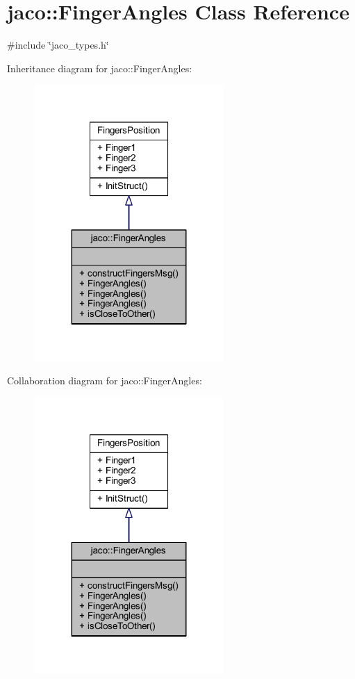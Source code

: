\hypertarget{classjaco_1_1FingerAngles}{}\section{jaco\+:\+:Finger\+Angles Class Reference}
\label{classjaco_1_1FingerAngles}


{\ttfamily \#include \char`\"{}jaco\+\_\+types.\+h\char`\"{}}



Inheritance diagram for jaco\+:\+:Finger\+Angles\+:
\nopagebreak
\begin{figure}[H]
\begin{center}
\leavevmode
\includegraphics[width=203pt]{de/df2/classjaco_1_1FingerAngles__inherit__graph}
\end{center}
\end{figure}


Collaboration diagram for jaco\+:\+:Finger\+Angles\+:
\nopagebreak
\begin{figure}[H]
\begin{center}
\leavevmode
\includegraphics[width=203pt]{d6/d68/classjaco_1_1FingerAngles__coll__graph}
\end{center}
\end{figure}
